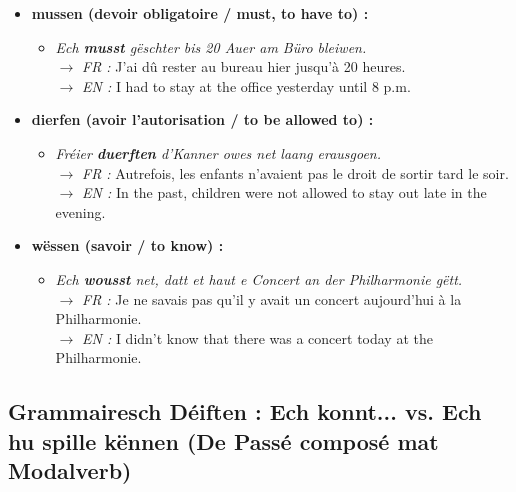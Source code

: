 \begin{itemize}
    \vspace{0.3em}

    \item \textbf{mussen (devoir obligatoire / must, to have to) :}
    \begin{itemize}
        \item \textit{Ech \textbf{musst} gëschter bis 20 Auer am Büro bleiwen.} \\
        $\rightarrow$ \textit{FR :} J'ai dû rester au bureau hier jusqu'à 20 heures. \\
        $\rightarrow$ \textit{EN :} I had to stay at the office yesterday until 8 p.m.
    \end{itemize}

    \vspace{0.3em}

    \item \textbf{dierfen (avoir l'autorisation / to be allowed to) :}
    \begin{itemize}
        \item \textit{Fréier \textbf{duerften} d'Kanner owes net laang erausgoen.} \\
        $\rightarrow$ \textit{FR :} Autrefois, les enfants n'avaient pas le droit de sortir tard le soir. \\
        $\rightarrow$ \textit{EN :} In the past, children were not allowed to stay out late in the evening.
    \end{itemize}

    \vspace{0.3em}

    \item \textbf{wëssen (savoir / to know) :}
    \begin{itemize}
        \item \textit{Ech \textbf{wousst} net, datt et haut e Concert an der Philharmonie gëtt.} \\
        $\rightarrow$ \textit{FR :} Je ne savais pas qu'il y avait un concert aujourd'hui à la Philharmonie. \\
        $\rightarrow$ \textit{EN :} I didn't know that there was a concert today at the Philharmonie.
    \end{itemize}
\end{itemize}

\subsection{Grammairesch Déiften : \flqq Ech konnt...\frqq{} vs. \flqq Ech hu spille kënnen\frqq{} (De Passé composé mat Modalverb)}

